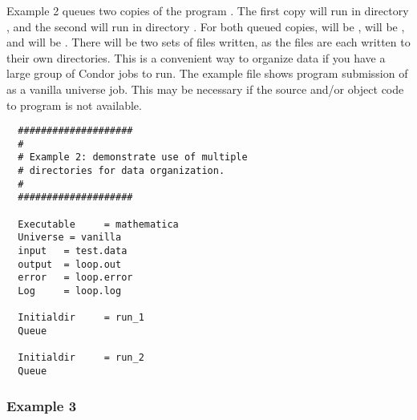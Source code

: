 Example 2 queues two copies of the program . The
first copy will run in directory , and the second will run in
directory . For both queued copies, 
 will be ,
 will be , and
 will be .
There will be two sets of files written,
as the files are each written to their own directories.
This is a convenient way to organize data if you
have a large group of Condor jobs to run. The example file 
shows program submission of
 as a vanilla universe job.
This may be necessary if the source
and/or object code to program  is not available.
\begin{verbatim}
  ####################     
  #                       
  # Example 2: demonstrate use of multiple     
  # directories for data organization.      
  #                                        
  ####################                    
                                         
  Executable     = mathematica          
  Universe = vanilla                   
  input   = test.data                
  output  = loop.out                
  error   = loop.error             
  Log     = loop.log                                                    
                                  
  Initialdir     = run_1         
  Queue                         
                               
  Initialdir     = run_2      
  Queue                     
\end{verbatim}

\subsubsection{Example 3}

